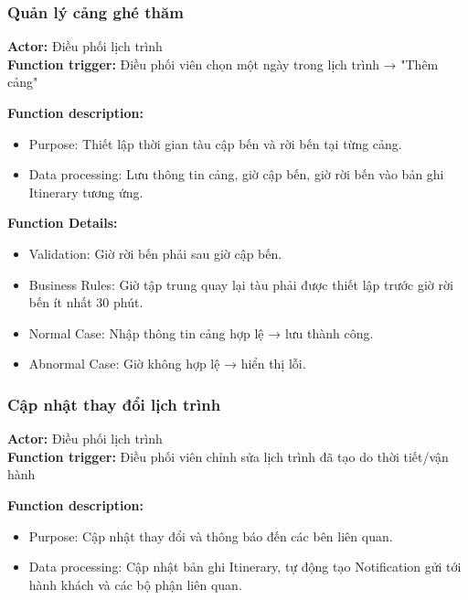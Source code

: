 
\subsubsection{Quản lý cảng ghé thăm}
\textbf{Actor:} Điều phối lịch trình \\
\textbf{Function trigger:} Điều phối viên chọn một ngày trong lịch trình
→ "Thêm cảng"

\textbf{Function description:}
\begin{itemize}
    \item Purpose: Thiết lập thời gian tàu cập bến và rời bến tại từng
    cảng.
    \item Data processing: Lưu thông tin cảng, giờ cập bến, giờ rời bến
    vào bản ghi Itinerary tương ứng.
\end{itemize}

\textbf{Function Details:}
\begin{itemize}
    \item Validation: Giờ rời bến phải sau giờ cập bến.
    \item Business Rules: Giờ tập trung quay lại tàu phải được thiết lập
    trước giờ rời bến ít nhất 30 phút.
    \item Normal Case: Nhập thông tin cảng hợp lệ → lưu thành công.
    \item Abnormal Case: Giờ không hợp lệ → hiển thị lỗi.
\end{itemize}


\subsubsection{Cập nhật thay đổi lịch trình}
\textbf{Actor:} Điều phối lịch trình \\
\textbf{Function trigger:} Điều phối viên chỉnh sửa lịch trình đã tạo do
thời tiết/vận hành

\textbf{Function description:}
\begin{itemize}
    \item Purpose: Cập nhật thay đổi và thông báo đến các bên liên quan.
    \item Data processing: Cập nhật bản ghi Itinerary, tự động tạo
    Notification gửi tới hành khách và các bộ phận liên quan.
\end{itemize}

